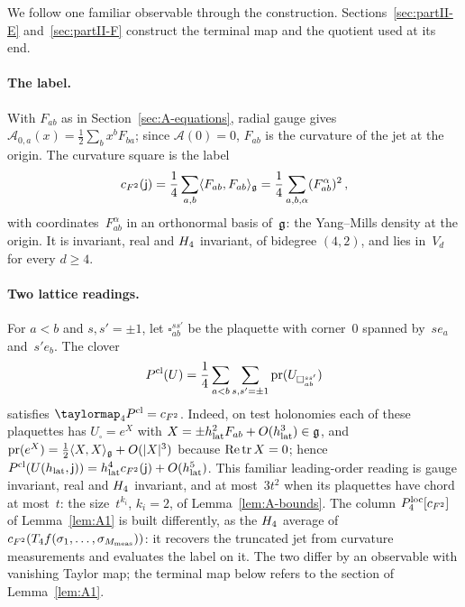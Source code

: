We follow one familiar observable through the construction. Sections~\ref{sec:partII-E} and~\ref{sec:partII-F} construct the terminal map and the quotient used at its end.

\paragraph{The label.} With $F_{ab}$ as in Section~\ref{sec:A-equations}, radial gauge gives $\mathcal A_{0,a}(x)=\frac12\sum_bx^bF_{ba}$; since $\mathcal A(0)=0$, $F_{ab}$ is the curvature of the jet at the origin. The curvature square is the label
\begin{equation*}
c_{F^2}(\mathsf j)=\frac14\sum_{a,b}\langle F_{ab},F_{ab}\rangle_{\mathfrak{g}}=\frac14\sum_{a,b,\alpha}(F_{ab}^\alpha)^2\,,
\end{equation*}
with coordinates~$F^\alpha_{ab}$ in an orthonormal basis of~$\mathfrak{g}$: the Yang--Mills density at the origin. It is invariant, real and $H_4$ invariant, of bidegree $(4,2)$, and lies in~$V_d$ for every $d\ge4$.

\paragraph{Two lattice readings.} For $a<b$ and $s,s'=\pm1$, let $\square_{ab}^{ss'}$ be the plaquette with corner~$0$ spanned by~$se_a$ and~$s'e_b$. The clover
\begin{equation*}
P^{\rm cl}(U)=\frac14\sum_{a<b}\sum_{s,s'=\pm1}\operatorname{pr}(U_{\square_{ab}^{ss'}})
\end{equation*}
satisfies $\taylormap_{4}P^{\rm cl}=c_{F^2}$. Indeed, on test holonomies each of these plaquettes has $U_\square=e^X$ with $X=\pm h_{\rm lat}^2F_{ab}+O(h_{\rm lat}^3)\in\mathfrak{g}$, and $\operatorname{pr}(e^X)=\frac12\langle X,X\rangle_{\mathfrak{g}}+O(|X|^3)$ because $\operatorname{Re}\operatorname{tr} X=0$; hence $P^{\rm cl}(U(h_{\rm lat},\mathsf j))=h_{\rm lat}^4c_{F^2}(\mathsf j)+O(h_{\rm lat}^5)$. This familiar leading-order reading is gauge invariant, real and $H_4$ invariant, and at most~$3t^2$ when its plaquettes have chord at most~$t$: the size~$t^{k_i}$, $k_i=2$, of Lemma~\ref{lem:A-bounds}. The column $P_{4}^{\mathrm{loc}}[c_{F^2}]$ of Lemma~\ref{lem:A1} is built differently, as the $H_4$ average of $c_{F^2}(T_4f(\sigma_1,\ldots,\sigma_{M_{\rm meas}}))$: it recovers the truncated jet from curvature measurements and evaluates the label on it. The two differ by an observable with vanishing Taylor map; the terminal map below refers to the section of Lemma~\ref{lem:A1}.

